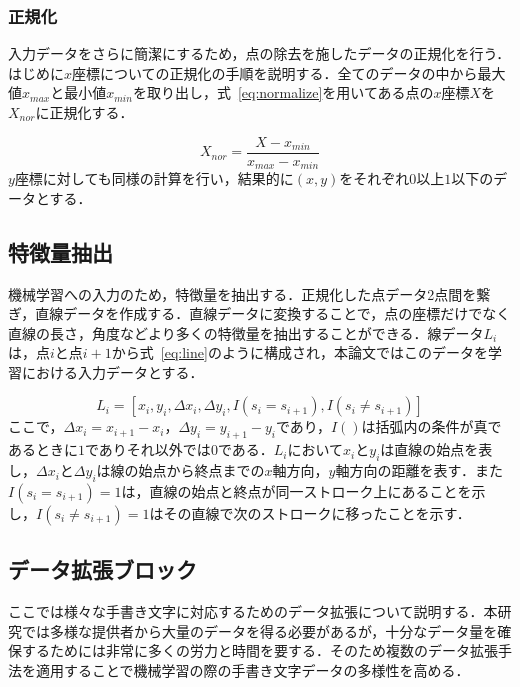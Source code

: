\subsubsection{正規化}
\label{normal}
入力データをさらに簡潔にするため，点の除去を施したデータの正規化を行う．はじめに$x$座標についての正規化の手順を説明する．全てのデータの中から最大値$x_{max}$と最小値$x_{min}$を取り出し，式~\ref{eq:normalize}を用いてある点の$x$座標$X$を$X_{nor}$に正規化する．

\begin{equation}
  X_{nor} = \frac{X - x_{min}}{x_{max}-x_{min}}
  \label{eq:normalize}
\end{equation}
$y$座標に対しても同様の計算を行い，結果的に$(x, y)$をそれぞれ$0$以上$1$以下のデータとする．

\subsection{特徴量抽出}
\label{extract}
機械学習への入力のため，特徴量を抽出する．正規化した点データ2点間を繋ぎ，直線データを作成する．直線データに変換することで，点の座標だけでなく直線の長さ，角度などより多くの特徴量を抽出することができる．線データ$L_i$は，点$i$と点$i+1$から式~\ref{eq:line}のように構成され，本論文ではこのデータを学習における入力データとする．

\begin{equation}
  L_i = [x_i, y_i, \Delta{x_i}, \Delta{y_i}, I(s_i=s_{i+1}), I(s_i \neq s_{i+1})]
  \label{eq:line}
\end{equation}
ここで，$\Delta{x_i}=x_{i+1}-x_i$，$\Delta{y_i}=y_{i+1}-y_i$であり，$I()$は括弧内の条件が真であるときに$1$でありそれ以外では$0$である．$L_i$において$x_i$と$y_i$は直線の始点を表し，$\Delta{x_i}$と$\Delta{y_i}$は線の始点から終点までの$x$軸方向，$y$軸方向の距離を表す．また$I(s_i=s_{i+1})=1$は，直線の始点と終点が同一ストローク上にあることを示し，$I(s_i \neq s_{i+1})=1$はその直線で次のストロークに移ったことを示す．

\subsection{データ拡張ブロック}
\label{augment}
ここでは様々な手書き文字に対応するためのデータ拡張について説明する．本研究では多様な提供者から大量のデータを得る必要があるが，十分なデータ量を確保するためには非常に多くの労力と時間を要する．そのため複数のデータ拡張手法を適用することで機械学習の際の手書き文字データの多様性を高める．

